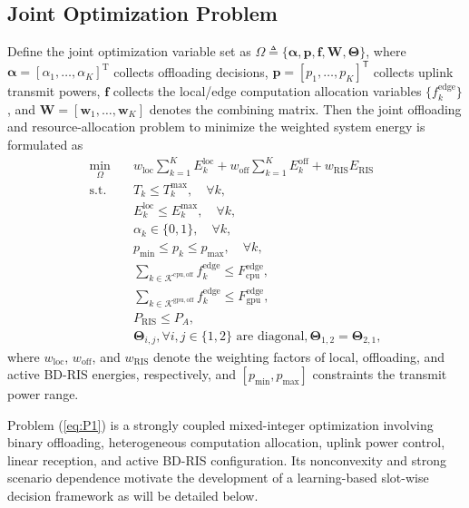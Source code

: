 \documentclass[conference]{IEEEtran}
\begin{document}
\subsection{Joint Optimization Problem}

Define the joint optimization variable set as
$\Omega \triangleq \{\boldsymbol{\alpha},\mathbf{p},\mathbf{f},\mathbf{W},\mathbf{\Theta}\}$,
where $\boldsymbol{\alpha} = [\alpha_1,\ldots,\alpha_K]^\mathrm{T}$ collects offloading decisions, $\mathbf{p} = [p_1,\ldots,p_K]^\mathsf{T}$ collects uplink transmit powers, $\mathbf{f}$ collects the local/edge computation allocation variables $\{f_k^\mathrm{edge}\}$, and $\mathbf{W} = [\mathbf{w}_1,\ldots,\mathbf{w}_K]$ denotes the combining matrix.
Then the joint offloading and resource-allocation problem to minimize the weighted system energy is formulated as
\begin{subequations}\label{eq:P1}
\begin{align}
\min_{\Omega}\quad
&
w_{\mathrm{loc}}\sum_{k=1}^{K}E_k^{\mathrm{loc}}
+
w_{\mathrm{off}}\sum_{k=1}^{K}E_k^{\mathrm{off}}
+
w_{\mathrm{RIS}}E_{\mathrm{RIS}}
\\
\text{s.t.}\quad
&
T_k\leq T_k^{\max},\quad \forall k,
\\
&E_k^\mathrm{loc}\le E_k^\mathrm{max}, \quad \forall k,\\
&
\alpha_k\in\{0,1\},\quad \forall k,
\\
&
p_{\min}\leq p_k\leq p_{\max},\quad \forall k,
\\
&
\sum_{k\in\mathcal{K}^{\mathrm{cpu,off}}} f_k^{\mathrm{edge}}\leq F_{\mathrm{cpu}}^{\mathrm{edge}},
\\
&
\sum_{k\in\mathcal{K}^{\mathrm{gpu,off}}} f_k^{\mathrm{edge}}\leq F_{\mathrm{gpu}}^{\mathrm{edge}},
\\
&
P_{\mathrm{RIS}}\leq P_A,\\
& \mathbf{\Theta}_{i,j}, \forall i,j\in\{1,2\}\text{~are~diagonal}, \mathbf{\Theta}_{1,2} = \mathbf{\Theta}_{2,1},
\end{align}
\end{subequations}
where $w_{\mathrm{loc}}$, $w_{\mathrm{off}}$, and $w_{\mathrm{RIS}}$ denote the weighting factors of local, offloading, and active BD-RIS energies, respectively, and $[p_\mathrm{min},p_\mathrm{max}]$ constraints the transmit power range.


Problem (\ref{eq:P1}) is a strongly coupled mixed-integer optimization  involving binary offloading, heterogeneous computation allocation, uplink power control, linear reception, and active BD-RIS configuration. Its nonconvexity and strong scenario dependence motivate the development of a learning-based slot-wise decision framework as will be detailed below.
\end{document}
